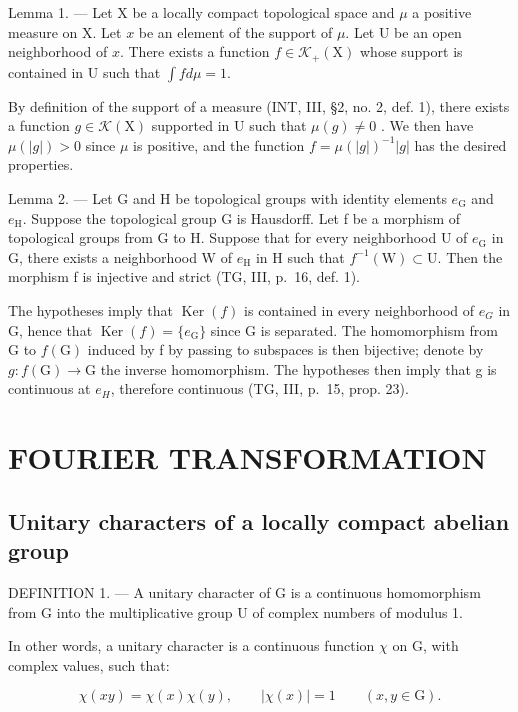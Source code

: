 Lemma 1. --- Let X be a locally compact topological space and \(\mu\) a positive measure on X. Let \(x\) be an element of the support of \(\mu\). Let U be an open neighborhood of \(x\). There exists a function \(f \in \mathcal{K}_{+}(\mathrm{X})\) whose support is contained in U such that \(\int fd\mu = 1\).

By definition of the support of a measure (INT, III, §2, no. 2, def. 1), there exists a function \(g \in \mathcal{K}(\mathrm{X})\) supported in U such that \(\mu(g) \neq 0\) . We then have \(\mu(|g|) > 0\) since \(\mu\) is positive, and the function \(f = \mu(|g|)^{-1}|g|\) has the desired properties.

Lemma 2. --- Let G and H be topological groups with identity elements \(e_{\mathrm{G}}\) and \(e_{\mathrm{H}}\). Suppose the topological group G is Hausdorff. Let f be a morphism of topological groups from G to H. Suppose that for every neighborhood U of \(e_{\mathrm{G}}\) in G, there exists a neighborhood W of \(e_{\mathrm{H}}\) in H such that \(f^{-1}(\mathrm{W}) \subset \mathrm{U}\). Then the morphism f is injective and strict (TG, III, p.~16, def. 1).

The hypotheses imply that \(\operatorname{Ker}(f)\) is contained in every neighborhood of \(e_{G}\) in G, hence that \(\operatorname{Ker}(f) = \{e_{\mathrm{G}}\}\) since G is separated. The homomorphism from G to \(f(\mathrm{G})\) induced by f by passing to subspaces is then bijective; denote by \(g: f(\mathrm{G}) \to \mathrm{G}\) the inverse homomorphism. The hypotheses then imply that g is continuous at \(e_{H}\), therefore continuous (TG, III, p.~15, prop. 23).

\section{FOURIER TRANSFORMATION}

\subsection{Unitary characters of a locally compact abelian group}

DEFINITION 1. --- A unitary character of G is a continuous homomorphism from G into the multiplicative group U of complex numbers of modulus 1.

In other words, a unitary character is a continuous function \(\chi\) on G, with complex values, such that:

\[
\chi (x y) = \chi (x) \chi (y), \qquad | \chi (x) | = 1 \qquad (x, y \in \mathrm{G}).
\]

